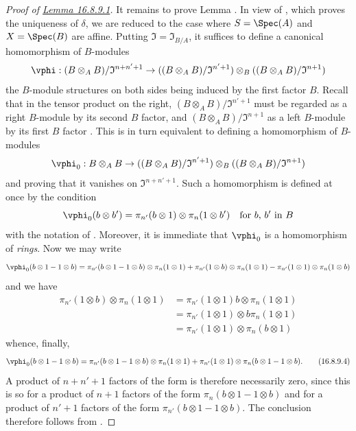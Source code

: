 \begin{proof}[Proof of {\hyperlink{ega4.c04.lem.16-8-9-1}{Lemma 16.8.9.1}}]
It remains to prove Lemma .
In view of , which proves the uniqueness of $\delta$, we are reduced to the case where $S = \Spec(A)$ and $X = \Spec(B)$ are affine.
Putting $\mathfrak{I} = \mathfrak{I}_{B/A}$, it suffices to define a canonical homomorphism of $B$-modules
\[
  \vphi: (B \otimes_A B)/\mathfrak{I}^{n+n'+1} \to ((B \otimes_A B)/\mathfrak{I}^{n' + 1}) \otimes_B ((B \otimes_A B)/\mathfrak{I}^{n + 1})
\]
the $B$-module structures on both sides being induced by the first factor $B$.
Recall that in the tensor product on the right, $(B \otimes_A B)/\mathfrak{I}^{n' + 1}$ must be regarded
as a right $B$-module by its second $B$ factor, and $(B \otimes_A B)/\mathfrak{I}^{n + 1}$ as a left $B$-module by its first $B$ factor .
This is in turn equivalent to defining a homomorphism of $B$-modules
\[
  \vphi_0: B \otimes_A B \to ((B \otimes_A B)/\mathfrak{I}^{n' + 1}) \otimes_B ((B \otimes_A B)/\mathfrak{I}^{n + 1})
\]
and proving that it vanishes on $\mathfrak{I}^{n+n'+1}$.
Such a homomorphism is defined at once by the condition
\[
  \vphi_0(b \otimes b') = \pi_{n'}(b \otimes 1) \otimes \pi_n(1 \otimes b') \quad \text{for $b$, $b'$ in $B$}
\]
with the notation of .
Moreover, it is immediate that $\vphi_0$ is a homomorphism of \emph{rings}.
Now we may write
\[
  \vphi_0(b \otimes 1 - 1 \otimes b) = \pi_{n'}(b \otimes 1 - 1 \otimes b) \otimes \pi_n(1 \otimes 1) + \pi_{n'}(1 \otimes b) \otimes \pi_n(1 \otimes 1) - \pi_{n'}(1 \otimes 1) \otimes \pi_n(1 \otimes b)
\]
and we have 
\[
  \begin{aligned}
  \pi_{n'}(1 \otimes b) \otimes \pi_n(1 \otimes 1)
  &=\pi_{n'}(1 \otimes 1)b \otimes \pi_n(1 \otimes 1)\\
  &=\pi_{n'}(1 \otimes 1) \otimes b\pi_n(1 \otimes 1)\\
  &=\pi_{n'}(1 \otimes 1) \otimes \pi_n(b \otimes 1)
  \end{aligned}
\]
whence, finally,
\[
  \label{IV.16.8.9.4}
  \vphi_0(b \otimes 1 - 1 \otimes b) = \pi_{n'}(b \otimes 1 - 1 \otimes b) \otimes \pi_n(1 \otimes 1) + \pi_{n'}(1 \otimes 1) \otimes \pi_n(b \otimes 1 - 1 \otimes b). 
  \tag{16.8.9.4}
\]
A product of $n + n' + 1$ factors of the form  is therefore necessarily zero, since this is so for a product of $n+1$ factors of the form $\pi_n(b \otimes 1 - 1 \otimes b)$ and for a product of $n' + 1$ factors of the form $\pi_{n'}(b \otimes 1 - 1 \otimes b)$.
The conclusion therefore follows from .
\end{proof}

